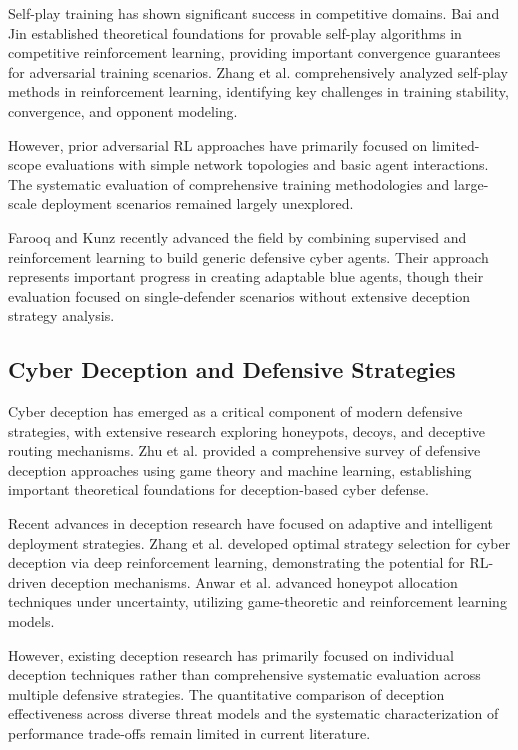 \documentclass[12pt,oneside]{article}
\begin{document}
Self-play training has shown significant success in competitive domains. Bai and Jin \cite{bai2020provable} established theoretical foundations for provable self-play algorithms in competitive reinforcement learning, providing important convergence guarantees for adversarial training scenarios. Zhang et al. \cite{zhang2024survey} comprehensively analyzed self-play methods in reinforcement learning, identifying key challenges in training stability, convergence, and opponent modeling.

However, prior adversarial RL approaches have primarily focused on limited-scope evaluations with simple network topologies and basic agent interactions. The systematic evaluation of comprehensive training methodologies and large-scale deployment scenarios remained largely unexplored.

Farooq and Kunz \cite{farooq2025combining} recently advanced the field by combining supervised and reinforcement learning to build generic defensive cyber agents. Their approach represents important progress in creating adaptable blue agents, though their evaluation focused on single-defender scenarios without extensive deception strategy analysis.

\subsection{Cyber Deception and Defensive Strategies}

Cyber deception has emerged as a critical component of modern defensive strategies, with extensive research exploring honeypots, decoys, and deceptive routing mechanisms. Zhu et al. \cite{zhu2021survey} provided a comprehensive survey of defensive deception approaches using game theory and machine learning, establishing important theoretical foundations for deception-based cyber defense.

Recent advances in deception research have focused on adaptive and intelligent deployment strategies. Zhang et al. \cite{zhang2022optimal} developed optimal strategy selection for cyber deception via deep reinforcement learning, demonstrating the potential for RL-driven deception mechanisms. Anwar et al. \cite{anwar2022honeypot} advanced honeypot allocation techniques under uncertainty, utilizing game-theoretic and reinforcement learning models.

However, existing deception research has primarily focused on individual deception techniques rather than comprehensive systematic evaluation across multiple defensive strategies. The quantitative comparison of deception effectiveness across diverse threat models and the systematic characterization of performance trade-offs remain limited in current literature.
\end{document}
